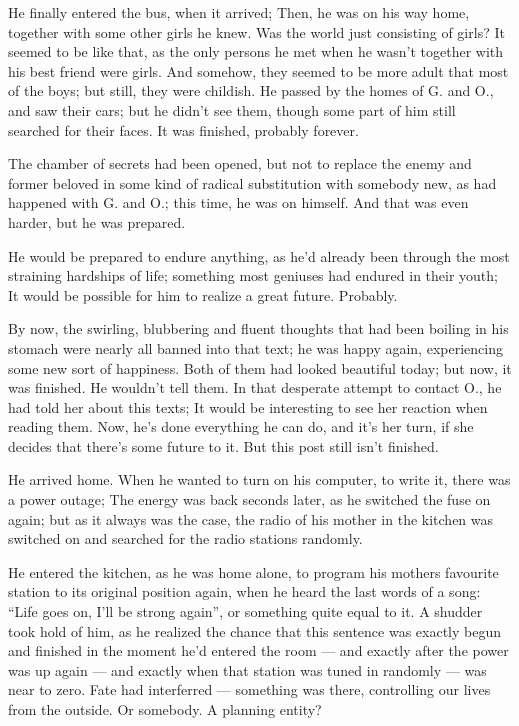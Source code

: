 He finally entered the bus, when it arrived; Then, he was on his way home, together with some other girls he knew. Was the world just consisting of girls?
It seemed to be like that, as the only persons he met when he wasn't together with his best friend were girls. 
And somehow, they seemed to be more adult that most of the boys; but still, they were childish. 
He passed by the homes of G. and O., and saw their cars; but he didn't see them, though some part of him still searched for their faces. 
It was finished, probably forever.

The chamber of secrets had been opened, but not to replace the enemy and former beloved in some kind of radical substitution with somebody new, as had happened with G. and O.; this time, he was on himself. 
And that was even harder, but he was prepared.

He would be prepared to endure anything, as he'd already been through the most straining hardships of life; something most geniuses had endured in their youth; It would be possible for him to realize a great future. 
Probably.

By now, the swirling, blubbering and fluent thoughts that had been boiling in his stomach were nearly all banned into that text; he was happy again, experiencing some new sort of happiness. 
Both of them had looked beautiful today; but now, it was finished. He wouldn't tell them. In that desperate attempt to contact O., he had told her about this texts; It would be interesting to see her reaction when reading them. Now, he's done everything he can do, and it's her turn, if she decides that there's some future to it. 
But this post still isn't finished.

He arrived home. When he wanted to turn on his computer, to write it, there was a power outage; The energy was back seconds later, as he switched the fuse on again; but as it always was the case, the radio of his mother in the kitchen was switched on and searched for the radio stations randomly.

He entered the kitchen, as he was home alone, to program his mothers favourite station to its original position again, when he heard the last words of a song: \enquote{Life goes on, I'll be strong again}, or something quite equal to it.
A shudder took hold of him, as he realized the chance that this sentence was exactly begun and finished in the moment he'd entered the room --- and exactly after the power was up again --- and exactly when that station was tuned in randomly --- was near to zero. 
Fate had interferred --- something was there, controlling our lives from the outside. 
Or somebody. 
A planning entity?

